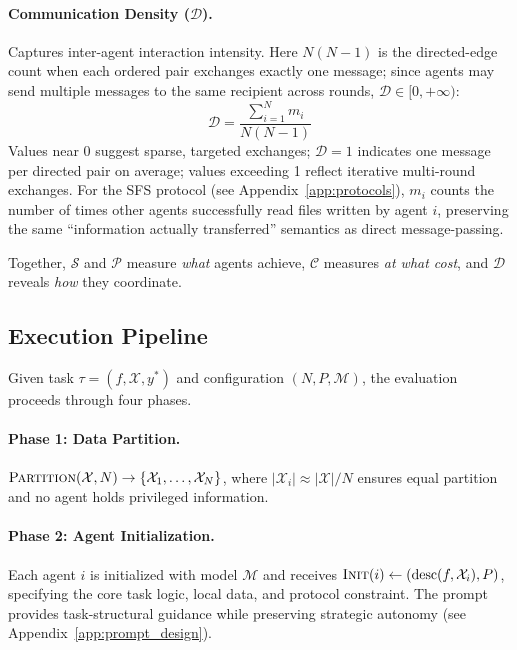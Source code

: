 \paragraph{Communication Density ($\mathcal{D}$).}
Captures inter-agent interaction intensity. 
Here $N(N-1)$ is the directed-edge count when each ordered pair exchanges exactly one message; since agents may send multiple messages to the same recipient across rounds, $\mathcal{D} \in [0, +\infty)$:
\begin{equation}
\mathcal{D} = \frac{\sum_{i=1}^{N} m_i}{N(N-1)}
\end{equation}
Values near 0 suggest sparse, targeted exchanges; $\mathcal{D} = 1$ indicates one message per directed pair on average; values exceeding 1 reflect iterative multi-round exchanges. For the SFS protocol (see Appendix~\ref{app:protocols}), $m_i$ counts the number of times other agents successfully read files written by agent $i$, preserving the same ``information actually transferred'' semantics as direct message-passing.

Together, $\mathcal{S}$ and $\mathcal{P}$ measure \textit{what} agents achieve, $\mathcal{C}$ measures \textit{at what cost}, and $\mathcal{D}$ reveals \textit{how} they coordinate.

\subsection{Execution Pipeline}
\label{sec:pipeline}

Given task $\tau = (f, \mathcal{X}, y^*)$ and configuration $(N, P, \mathcal{M})$, the evaluation proceeds through four phases.

\paragraph{Phase 1: Data Partition.}
$\textsc{Partition}(\mathcal{X}, N) \rightarrow \{\mathcal{X}_1, \ldots, \mathcal{X}_N\}$, where $|\mathcal{X}_i| \approx |\mathcal{X}|/N$ ensures equal partition and no agent holds privileged information.

\paragraph{Phase 2: Agent Initialization.}
Each agent $i$ is initialized with model $\mathcal{M}$ and receives $\textsc{Init}(i) \leftarrow (\text{desc}(f, \mathcal{X}_i), P)$, specifying the core task logic, local data, and protocol constraint. 
The prompt provides task-structural guidance while preserving strategic autonomy (see Appendix~\ref{app:prompt_design}).

